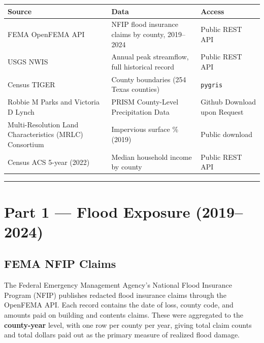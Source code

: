 \documentclass[
  letterpaper,
  DIV=11,
  numbers=noendperiod]{scrartcl}
\newcounter{none} %
\begin{document}
{\def\LTcaptype{none} %
\begin{longtable}[]{@{}
  >{\raggedright\arraybackslash}p{}
  >{\raggedright\arraybackslash}p{}
  >{\raggedright\arraybackslash}p{}@{}}
\toprule\noalign{}
\begin{minipage}[b]{\linewidth}\raggedright
Source
\end{minipage} & \begin{minipage}[b]{\linewidth}\raggedright
Data
\end{minipage} & \begin{minipage}[b]{\linewidth}\raggedright
Access
\end{minipage} \\
\midrule\noalign{}
\endhead
\bottomrule\noalign{}
\endlastfoot
FEMA OpenFEMA API & NFIP flood insurance claims by county, 2019--2024 &
Public REST API \\
USGS NWIS & Annual peak streamflow, full historical record & Public REST
API \\
Census TIGER & County boundaries (254 Texas counties) &
\texttt{pygris} \\
Robbie M Parks and Victoria D Lynch & PRISM County-Level Precipitation
Data & Github Download upon Request \\
Multi-Resolution Land Characteristics (MRLC) Consortium & Impervious
surface \% (2019) & Public download \\
Census ACS 5-year (2022) & Median household income by county & Public
REST API \\
\end{longtable}
}

\begin{center}\rule{0.5\linewidth}{0.5pt}\end{center}

\section{Part 1 --- Flood Exposure
(2019--2024)}\label{part-1-flood-exposure-20192024}

\subsection{FEMA NFIP Claims}\label{fema-nfip-claims}

The Federal Emergency Management Agency's National Flood Insurance
Program (NFIP) publishes redacted flood insurance claims through the
OpenFEMA API. Each record contains the date of loss, county code, and
amounts paid on building and contents claims. These were aggregated to
the \textbf{county-year} level, with one row per county per year, giving
total claim counts and total dollars paid out as the primary measure of
realized flood damage.
\end{document}
